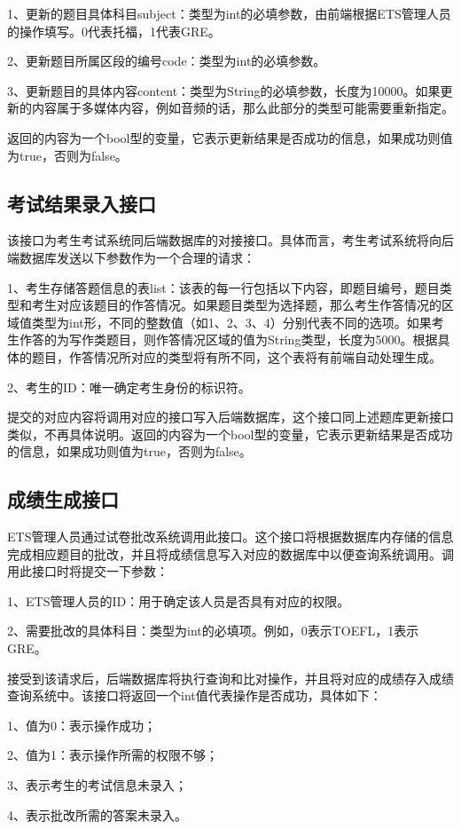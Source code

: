 1、更新的题目具体科目subject：类型为int的必填参数，由前端根据ETS管理人员的操作填写。0代表托福，1代表GRE。

2、更新题目所属区段的编号code：类型为int的必填参数。

3、更新题目的具体内容content：类型为String的必填参数，长度为10000。如果更新的内容属于多媒体内容，例如音频的话，那么此部分的类型可能需要重新指定。

返回的内容为一个bool型的变量，它表示更新结果是否成功的信息，如果成功则值为true，否则为false。

\subsection{考试结果录入接口}
该接口为考生考试系统同后端数据库的对接接口。具体而言，考生考试系统将向后端数据库发送以下参数作为一个合理的请求：

1、考生存储答题信息的表list：该表的每一行包括以下内容，即题目编号，题目类型和考生对应该题目的作答情况。如果题目类型为选择题，那么考生作答情况的区域值类型为int形，不同的整数值（如1、2、3、4）分别代表不同的选项。如果考生作答的为写作类题目，则作答情况区域的值为String类型，长度为5000。根据具体的题目，作答情况所对应的类型将有所不同，这个表将有前端自动处理生成。

2、考生的ID：唯一确定考生身份的标识符。

提交的对应内容将调用对应的接口写入后端数据库，这个接口同上述题库更新接口类似，不再具体说明。返回的内容为一个bool型的变量，它表示更新结果是否成功的信息，如果成功则值为true，否则为false。

\subsection{成绩生成接口}
ETS管理人员通过试卷批改系统调用此接口。这个接口将根据数据库内存储的信息完成相应题目的批改，并且将成绩信息写入对应的数据库中以便查询系统调用。调用此接口时将提交一下参数：

1、ETS管理人员的ID：用于确定该人员是否具有对应的权限。

2、需要批改的具体科目：类型为int的必填项。例如，0表示TOEFL，1表示GRE。

接受到该请求后，后端数据库将执行查询和比对操作，并且将对应的成绩存入成绩查询系统中。该接口将返回一个int值代表操作是否成功，具体如下：

1、值为0：表示操作成功；

2、值为1：表示操作所需的权限不够；

3、表示考生的考试信息未录入；

4、表示批改所需的答案未录入。
